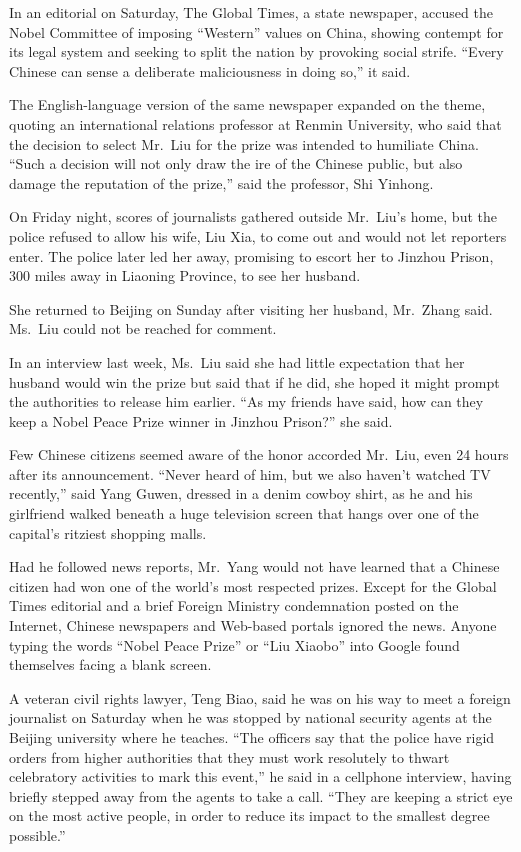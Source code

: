 ﻿\documentclass[12pt]{article}
\begin{document}
In an editorial on Saturday, The Global Times, a state newspaper, accused the Nobel Committee of
imposing ``Western'' values on China, showing contempt for its legal system and seeking to split the
nation by provoking social strife. ``Every Chinese can sense a deliberate maliciousness in doing
so,'' it said.

The English-language version of the same newspaper expanded on the theme, quoting an international
relations professor at Renmin University, who said that the decision to select Mr.~Liu for the prize
was intended to humiliate China. ``Such a decision will not only draw the ire of the Chinese public,
but also damage the reputation of the prize,'' said the professor, Shi Yinhong.

On Friday night, scores of journalists gathered outside Mr.~Liu's home, but the police refused to
allow his wife, Liu Xia, to come out and would not let reporters enter. The police later led her
away, promising to escort her to Jinzhou Prison, 300 miles away in Liaoning Province, to see her
husband.

She returned to Beijing on Sunday after visiting her husband, Mr.~Zhang said. Ms.~Liu could not be
reached for comment.

In an interview last week, Ms.~Liu said she had little expectation that her husband would win the
prize but said that if he did, she hoped it might prompt the authorities to release him earlier.
``As my friends have said, how can they keep a Nobel Peace Prize winner in Jinzhou Prison?'' she
said.

Few Chinese citizens seemed aware of the honor accorded Mr.~Liu, even 24 hours after its
announcement. ``Never heard of him, but we also haven't watched TV recently,'' said Yang Guwen,
dressed in a denim cowboy shirt, as he and his girlfriend walked beneath a huge television screen
that hangs over one of the capital's ritziest shopping malls.

Had he followed news reports, Mr.~Yang would not have learned that a Chinese citizen had won one of
the world's most respected prizes. Except for the Global Times editorial and a brief Foreign
Ministry condemnation posted on the Internet, Chinese newspapers and Web-based portals ignored the
news. Anyone typing the words ``Nobel Peace Prize'' or ``Liu Xiaobo'' into Google found themselves
facing a blank screen.

A veteran civil rights lawyer, Teng Biao, said he was on his way to meet a foreign journalist on
Saturday when he was stopped by national security agents at the Beijing university where he teaches.
``The officers say that the police have rigid orders from higher authorities that they must work
resolutely to thwart celebratory activities to mark this event,'' he said in a cellphone interview,
having briefly stepped away from the agents to take a call. ``They are keeping a strict eye on the
most active people, in order to reduce its impact to the smallest degree possible.''
\end{document}
